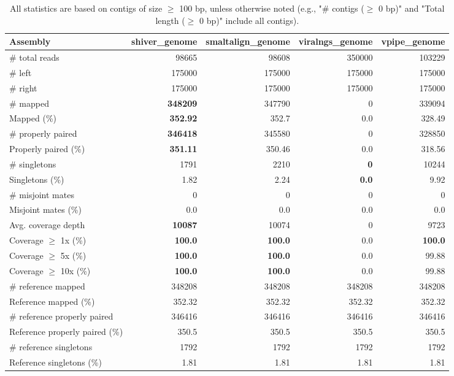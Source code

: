 \documentclass[12pt,a4paper]{article}
\begin{document}
\begin{table}[ht]
\begin{center}
\caption{All statistics are based on contigs of size $\geq$ 100 bp, unless otherwise noted (e.g., "\# contigs ($\geq$ 0 bp)" and "Total length ($\geq$ 0 bp)" include all contigs).}
\begin{tabular}{|l*{4}{|r}|}
\hline
Assembly & shiver\_genome & smaltalign\_genome & viralngs\_genome & vpipe\_genome \\ \hline
\# total reads & 98665 & 98608 & 350000 & 103229 \\ \hline
\# left & 175000 & 175000 & 175000 & 175000 \\ \hline
\# right & 175000 & 175000 & 175000 & 175000 \\ \hline
\# mapped & {\bf 348209} & 347790 & 0 & 339094 \\ \hline
Mapped (\%) & {\bf 352.92} & 352.7 & 0.0 & 328.49 \\ \hline
\# properly paired & {\bf 346418} & 345580 & 0 & 328850 \\ \hline
Properly paired (\%) & {\bf 351.11} & 350.46 & 0.0 & 318.56 \\ \hline
\# singletons & 1791 & 2210 & {\bf 0} & 10244 \\ \hline
Singletons (\%) & 1.82 & 2.24 & {\bf 0.0} & 9.92 \\ \hline
\# misjoint mates & 0 & 0 & 0 & 0 \\ \hline
Misjoint mates (\%) & 0.0 & 0.0 & 0.0 & 0.0 \\ \hline
Avg. coverage depth & {\bf 10087} & 10074 & 0 & 9723 \\ \hline
Coverage $\geq$ 1x (\%) & {\bf 100.0} & {\bf 100.0} & 0.0 & {\bf 100.0} \\ \hline
Coverage $\geq$ 5x (\%) & {\bf 100.0} & {\bf 100.0} & 0.0 & 99.88 \\ \hline
Coverage $\geq$ 10x (\%) & {\bf 100.0} & {\bf 100.0} & 0.0 & 99.88 \\ \hline
\# reference mapped & 348208 & 348208 & 348208 & 348208 \\ \hline
Reference mapped (\%) & 352.32 & 352.32 & 352.32 & 352.32 \\ \hline
\# reference properly paired & 346416 & 346416 & 346416 & 346416 \\ \hline
Reference properly paired (\%) & 350.5 & 350.5 & 350.5 & 350.5 \\ \hline
\# reference singletons & 1792 & 1792 & 1792 & 1792 \\ \hline
Reference singletons (\%) & 1.81 & 1.81 & 1.81 & 1.81 \\ \hline

\end{tabular}
\end{center}
\end{table}
\end{document}
